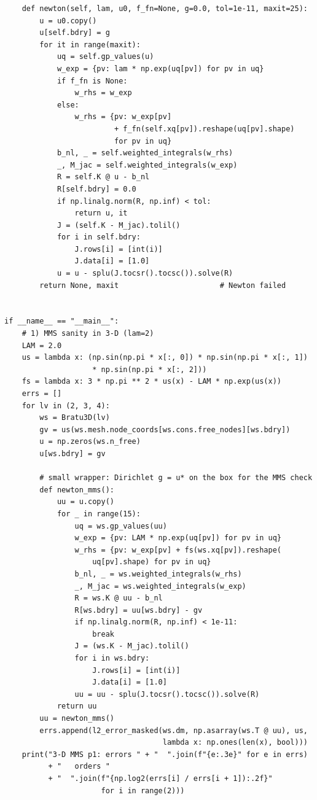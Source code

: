 \begin{lstlisting}
    def newton(self, lam, u0, f_fn=None, g=0.0, tol=1e-11, maxit=25):
        u = u0.copy()
        u[self.bdry] = g
        for it in range(maxit):
            uq = self.gp_values(u)
            w_exp = {pv: lam * np.exp(uq[pv]) for pv in uq}
            if f_fn is None:
                w_rhs = w_exp
            else:
                w_rhs = {pv: w_exp[pv]
                         + f_fn(self.xq[pv]).reshape(uq[pv].shape)
                         for pv in uq}
            b_nl, _ = self.weighted_integrals(w_rhs)
            _, M_jac = self.weighted_integrals(w_exp)
            R = self.K @ u - b_nl
            R[self.bdry] = 0.0
            if np.linalg.norm(R, np.inf) < tol:
                return u, it
            J = (self.K - M_jac).tolil()
            for i in self.bdry:
                J.rows[i] = [int(i)]
                J.data[i] = [1.0]
            u = u - splu(J.tocsr().tocsc()).solve(R)
        return None, maxit                       # Newton failed


if __name__ == "__main__":
    # 1) MMS sanity in 3-D (lam=2)
    LAM = 2.0
    us = lambda x: (np.sin(np.pi * x[:, 0]) * np.sin(np.pi * x[:, 1])
                    * np.sin(np.pi * x[:, 2]))
    fs = lambda x: 3 * np.pi ** 2 * us(x) - LAM * np.exp(us(x))
    errs = []
    for lv in (2, 3, 4):
        ws = Bratu3D(lv)
        gv = us(ws.mesh.node_coords[ws.cons.free_nodes][ws.bdry])
        u = np.zeros(ws.n_free)
        u[ws.bdry] = gv

        # small wrapper: Dirichlet g = u* on the box for the MMS check
        def newton_mms():
            uu = u.copy()
            for _ in range(15):
                uq = ws.gp_values(uu)
                w_exp = {pv: LAM * np.exp(uq[pv]) for pv in uq}
                w_rhs = {pv: w_exp[pv] + fs(ws.xq[pv]).reshape(
                    uq[pv].shape) for pv in uq}
                b_nl, _ = ws.weighted_integrals(w_rhs)
                _, M_jac = ws.weighted_integrals(w_exp)
                R = ws.K @ uu - b_nl
                R[ws.bdry] = uu[ws.bdry] - gv
                if np.linalg.norm(R, np.inf) < 1e-11:
                    break
                J = (ws.K - M_jac).tolil()
                for i in ws.bdry:
                    J.rows[i] = [int(i)]
                    J.data[i] = [1.0]
                uu = uu - splu(J.tocsr().tocsc()).solve(R)
            return uu
        uu = newton_mms()
        errs.append(l2_error_masked(ws.dm, np.asarray(ws.T @ uu), us,
                                    lambda x: np.ones(len(x), bool)))
    print("3-D MMS p1: errors " + "  ".join(f"{e:.3e}" for e in errs)
          + "   orders "
          + "  ".join(f"{np.log2(errs[i] / errs[i + 1]):.2f}"
                      for i in range(2)))


\end{lstlisting}
